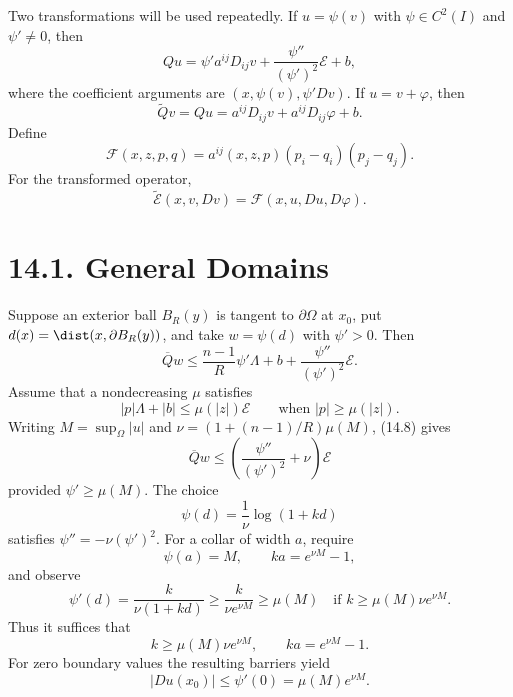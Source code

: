 Two transformations will be used repeatedly. If $u=\psi(v)$ with
$\psi\in C^2(I)$ and $\psi'\neq0$, then
\begin{equation}
Qu=\psi'a^{ij}D_{ij}v+\frac{\psi''}{(\psi')^2}\mathcal E+b,
\tag{14.4}
\end{equation}
where the coefficient arguments are $(x,\psi(v),\psi'Dv)$. If
$u=v+\varphi$, then
\begin{equation}
\widetilde Qv=Qu=a^{ij}D_{ij}v+a^{ij}D_{ij}\varphi+b.
\tag{14.5}
\end{equation}
Define
\begin{equation}
\mathcal F(x,z,p,q)=a^{ij}(x,z,p)(p_i-q_i)(p_j-q_j).
\tag{14.6}
\end{equation}
For the transformed operator,
\begin{equation}
\widetilde{\mathcal E}(x,v,Dv)=\mathcal F(x,u,Du,D\varphi).
\tag{14.7}
\end{equation}

\section*{14.1. General Domains}

Suppose an exterior ball $B_R(y)$ is tangent to $\partial\Omega$ at $x_0$, put
$d(x)=\dist(x,\partial B_R(y))$, and take $w=\psi(d)$ with $\psi'>0$. Then
\begin{equation}
\overline Qw
\leq\frac{n-1}{R}\psi'\Lambda+b
+\frac{\psi''}{(\psi')^2}\mathcal E.
\tag{14.8}
\end{equation}
Assume that a nondecreasing $\mu$ satisfies
\begin{equation}
|p|\Lambda+|b|\leq\mu(|z|)\mathcal E
\qquad\text{when }|p|\geq\mu(|z|).
\tag{14.9}
\end{equation}
Writing $M=\sup_\Omega|u|$ and
$\nu=(1+(n-1)/R)\mu(M)$, (14.8) gives
\begin{equation}
\overline Qw\leq
\left(\frac{\psi''}{(\psi')^2}+\nu\right)\mathcal E
\tag{14.10}
\end{equation}
provided $\psi'\geq\mu(M)$. The choice
\begin{equation}
\psi(d)=\frac1\nu\log(1+kd)
\tag{14.11}
\end{equation}
satisfies $\psi''=-\nu(\psi')^2$. For a collar of width $a$, require
\begin{equation}
\psi(a)=M,\qquad ka=e^{\nu M}-1,
\tag{14.12}
\end{equation}
and observe
\begin{equation}
\psi'(d)=\frac{k}{\nu(1+kd)}
\geq\frac{k}{\nu e^{\nu M}}\geq\mu(M)
\quad\text{if }k\geq\mu(M)\nu e^{\nu M}.
\tag{14.13}
\end{equation}
Thus it suffices that
\begin{equation}
k\geq\mu(M)\nu e^{\nu M},\qquad ka=e^{\nu M}-1.
\tag{14.14}
\end{equation}
For zero boundary values the resulting barriers yield
\begin{equation}
|Du(x_0)|\leq\psi'(0)=\mu(M)e^{\nu M}.
\tag{14.15}
\end{equation}

